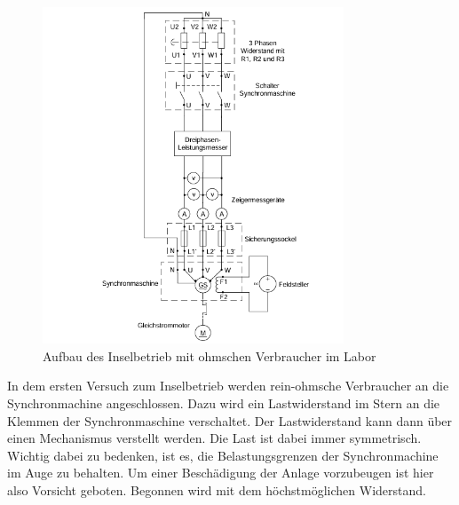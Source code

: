 \documentclass{report}
\begin{document}
\begin{figure}[!ht]
  \centering
  \includegraphics[width=0.8\textwidth]{./assets/img/inselbetrieb_ohmaufbau.png}
  \caption{Aufbau des Inselbetrieb mit ohmschen Verbraucher im Labor}
  \label{fig:insel_ohmaufbau}
\end{figure}

In dem ersten Versuch zum Inselbetrieb werden rein-ohmsche Verbraucher an die Synchronmachine angeschlossen. Dazu wird ein Lastwiderstand im Stern an die Klemmen der Synchronmaschine verschaltet. Der Lastwiderstand kann dann über einen Mechanismus verstellt werden. Die Last ist dabei immer symmetrisch. Wichtig dabei zu bedenken, ist es, die Belastungsgrenzen der Synchronmachine im Auge zu behalten. Um einer Beschädigung der Anlage vorzubeugen ist hier also Vorsicht geboten. Begonnen wird mit dem höchstmöglichen Widerstand.
\end{document}
